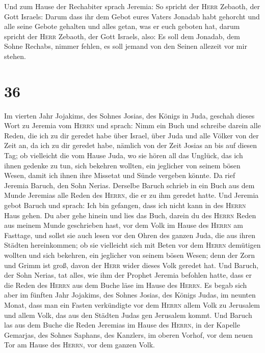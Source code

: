 Und zum Hause der Rechabiter sprach Jeremia: So spricht
der \textsc{Herr} Zebaoth, der Gott Israels: Darum dass ihr dem Gebot
eures Vaters Jonadab habt gehorcht und alle seine Gebote gehalten und
alles getan, was er euch geboten hat,  darum spricht der
\textsc{Herr} Zebaoth, der Gott Israels, also: Es soll dem Jonadab, dem
Sohne Rechabs, nimmer fehlen, es soll jemand von den Seinen allezeit vor
mir stehen.

\hypertarget{section-35}{%
\section{36}\label{section-35}}

 Im vierten Jahr Jojakims, des Sohnes Josias, des Königs
in Juda, geschah dieses Wort zu Jeremia vom \textsc{Herrn} und sprach:
 Nimm ein Buch und schreibe darein alle Reden, die ich zu
dir geredet habe über Israel, über Juda und alle Völker von der Zeit an,
da ich zu dir geredet habe, nämlich von der Zeit Josias an bis auf
diesen Tag;  ob vielleicht die vom Hause Juda, wo sie
hören all das Unglück, das ich ihnen gedenke zu tun, sich bekehren
wollten, ein jeglicher von seinem bösen Wesen, damit ich ihnen ihre
Missetat und Sünde vergeben könnte.  Da rief Jeremia
Baruch, den Sohn Nerias. Derselbe Baruch schrieb in ein Buch aus dem
Munde Jeremias alle Reden des \textsc{Herrn}, die er zu ihm geredet
hatte.  Und Jeremia gebot Baruch und sprach: Ich bin
gefangen, dass ich nicht kann in des \textsc{Herrn} Haus gehen.
 Du aber gehe hinein und lies das Buch, darein du des
\textsc{Herrn} Reden aus meinem Munde geschrieben hast, vor dem Volk im
Hause des \textsc{Herrn} am Fasttage, und sollst sie auch lesen vor den
Ohren des ganzen Juda, die aus ihren Städten hereinkommen;
 ob sie vielleicht sich mit Beten vor dem \textsc{Herrn}
demütigen wollten und sich bekehren, ein jeglicher von seinem bösen
Wesen; denn der Zorn und Grimm ist groß, davon der \textsc{Herr} wider
dieses Volk geredet hat.  Und Baruch, der Sohn Nerias, tat
alles, wie ihm der Prophet Jeremia befohlen hatte, dass er die Reden des
\textsc{Herrn} aus dem Buche läse im Hause des \textsc{Herrn}.
 Es begab sich aber im fünften Jahr Jojakims, des Sohnes
Josias, des Königs Judas, im neunten Monat, dass man ein Fasten
verkündigte vor dem \textsc{Herrn} allem Volk zu Jerusalem und allem
Volk, das aus den Städten Judas gen Jerusalem kommt.  Und
Baruch las aus dem Buche die Reden Jeremias im Hause des \textsc{Herrn},
in der Kapelle Gemarjas, des Sohnes Saphans, des Kanzlers, im oberen
Vorhof, vor dem neuen Tor am Hause des \textsc{Herrn}, vor dem ganzen
Volk.

